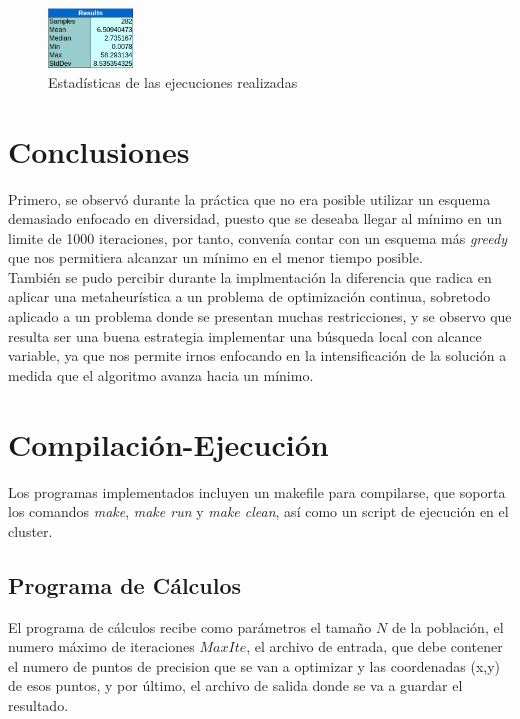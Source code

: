 \documentclass[10pt,journal,compsoc]{styles/IEEEtran}
\begin{document}
   \begin{figure}[H]
    \centering
    \includegraphics[width = 0.2\textwidth]{tablita.png}
    \caption{Estad\'isticas de las ejecuciones realizadas}
  \end{figure}
  
  
\section{Conclusiones}

Primero, se observ\'o durante la pr\'actica que no era posible utilizar un esquema demasiado enfocado en diversidad, puesto que se deseaba llegar al mínimo en un limite de 1000 iteraciones, por tanto, conven\'ia  contar con un esquema m\'as \emph{greedy} que nos permitiera alcanzar un mínimo en el menor tiempo posible.\\

También se pudo percibir durante la implmentaci\'on la diferencia que radica en aplicar una metaheur\'istica a un problema de optimizaci\'on continua, sobretodo aplicado a un problema donde se presentan muchas restricciones, y se observo que resulta ser una buena estrategia implementar una b\'usqueda local con alcance variable, ya que nos permite irnos enfocando en la intensificaci\'on de la soluci\'on a medida que el algoritmo avanza hacia un m\'inimo.

\section{Compilaci\'on-Ejecuci\'on}

Los programas implementados incluyen un makefile para compilarse, que soporta los comandos \emph{make}, \emph{make run} y \emph{make clean}, así como un script  de ejecución en el cluster.\\

\subsection{Programa de C\'alculos}

El programa de cálculos recibe como parámetros el tama\~no $N$ de la población, el numero máximo de iteraciones $MaxIte$, el archivo de entrada, que debe contener el numero de puntos de precision que se van a optimizar y las coordenadas (x,y) de esos puntos, y por \'ultimo, el archivo de salida donde se va a guardar el resultado.
\end{document}
